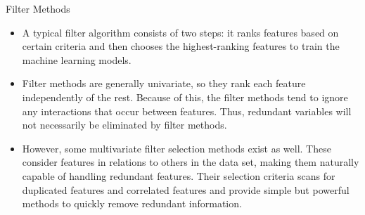 \documentclass[11pt]{beamer}
\begin{document}
\begin{frame}{Filter Methods}
	\begin{itemize}
		\item A typical filter algorithm consists of two steps: it ranks features based on certain criteria and then chooses the highest-ranking features to train the machine learning models.
		\item Filter methods are generally univariate, so they rank each feature independently of the rest. Because of this, the filter methods tend to ignore any interactions that occur between features. Thus, redundant variables will not necessarily be eliminated by filter methods.
		\item However, some multivariate filter selection methods exist as well. These consider features in relations to others in the data set, making them naturally capable of handling redundant features. Their selection criteria scans for duplicated features and correlated features and provide simple but powerful methods to quickly remove redundant information.
	\end{itemize}
\end{frame}
\end{document}
